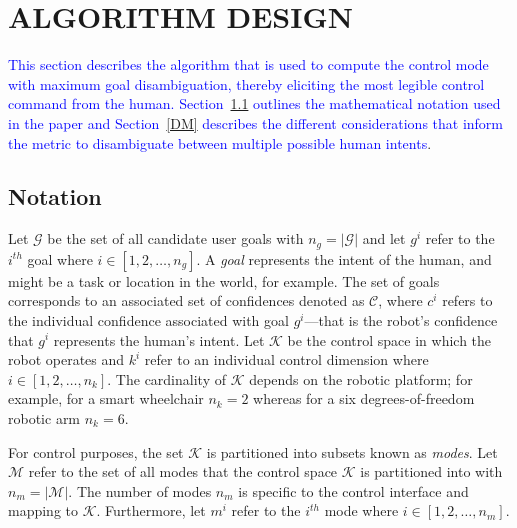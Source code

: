 \documentclass[conference]{IEEEtran}
\begin{document}
\section{ALGORITHM DESIGN} \label{ALGO}
\textcolor{blue}{This section describes the algorithm that is used to compute the control mode with maximum goal disambiguation, thereby eliciting the most legible control command from the human. Section~\ref{NOT} outlines the mathematical notation used in the paper and Section~\ref{DM} describes the different considerations that inform the metric to disambiguate between multiple possible human intents}. 

\subsection{Notation}\label{NOT}


Let $\mathcal{G}$ be the set of all candidate user goals with $n_g = \vert\mathcal{G}\vert$ and let $g^{i}$ refer to the $i^{th}$ goal where $i \in [1,2,\dots,n_g]$. A \textit{goal} represents the intent of the human, and might be a task or location in the world, for example. The set of goals corresponds to an associated set of confidences denoted as $\mathcal{C}$, where $c^{i}$ refers to the individual confidence associated with goal $g^{i}$---that is the robot's confidence that $g^{i}$ represents the human's intent. Let $\mathcal{K}$ be the control space in which the robot operates and $k^{i}$ refer to an individual control dimension where $i \in [1,2,\dots,n_k]$.  The cardinality of $\mathcal{K}$ depends on the robotic platform; for example, for a smart wheelchair $n_k = 2$ whereas for a six degrees-of-freedom robotic arm $n_k = 6$.

For control purposes, the set $\mathcal{K}$ is partitioned into subsets known as \textit{modes}. Let $\mathcal{M}$ refer to the set of all modes that the control space $\mathcal{K}$ is partitioned into with $n_{m} = \vert\mathcal{M}\vert$. The number of modes $n_{m}$ is specific to the control interface and mapping to $\mathcal{K}$. Furthermore, let $m^{i}$ refer to the $i^{th}$ mode where $i \in [1,2,\dots,n_{m}]$.
\end{document}
